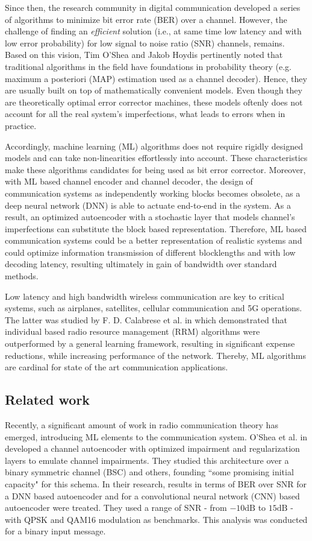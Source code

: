 \documentclass[conference]{IEEEtran}
\begin{document}
Since then, the research community in digital communication developed a series of algorithms to minimize bit error rate (BER) over a channel. However, the challenge of finding an \textit{efficient} solution  (i.e., at same time low latency and with low error probability) for low signal to noise ratio (SNR) channels, remains. Based on this vision, Tim O'Shea and Jakob Hoydis \cite{b2} pertinently noted that traditional algorithms in the field have foundations in probability theory (e.g. maximum a posteriori (MAP) estimation used as a channel decoder). Hence, they are usually built on top of mathematically convenient models. Even though they are theoretically optimal error corrector machines, these models oftenly does not account for all the real system's imperfections, what leads to errors when in practice.

Accordingly, machine learning (ML) algorithms does not require rigidly designed models and can take non-linearities effortlessly into account. These characteristics make these algorithms candidates for being used as bit error corrector. Moreover, with ML based channel encoder and channel decoder, the design of communication systems as independently working blocks becomes obsolete, as a deep neural network (DNN) is able to actuate end-to-end in the system. As a result, an optimized autoencoder with a stochastic layer that models channel's imperfections can substitute the block based representation. Therefore, ML based communication systems could be a better representation of realistic systems and could optimize information transmission of different blocklengths and with low decoding latency, resulting ultimately in gain of bandwidth over standard methods. 

Low latency and high bandwidth wireless communication are key to critical systems, such as airplanes, satellites, cellular communication and 5G operations. The latter was studied by F. D. Calabrese et al. in \cite{b3} which  demonstrated that individual based radio resource management (RRM) algorithms were outperformed by a general learning framework, resulting in significant expense reductions, while increasing performance of the network. Thereby, ML algorithms are cardinal for state of the art communication applications.
  
\subsection{Related work}

Recently, a significant amount of work in radio communication theory has emerged, introducing ML elements to the communication system. O'Shea et al. in \cite{osheaautoencoder} developed a channel autoencoder with optimized impairment and regularization layers to emulate channel impairments. They studied this architecture over a binary symmetric channel (BSC) and others, founding ``some promising initial capacity" for this schema. In their research, results in terms of BER over SNR for a DNN based autoencoder and for a convolutional neural network (CNN) based autoencoder were treated. They used a range of SNR - from $-10 \text{dB}$ to $15 \text{dB}$ - with QPSK and QAM16 modulation as benchmarks. This analysis was conducted for a binary input message.
\end{document}
